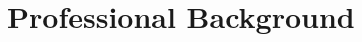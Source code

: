 \documentclass[11pt]{article}
\begin{document}




\section{Professional Background}
\label{sec:back}
\end{document}
